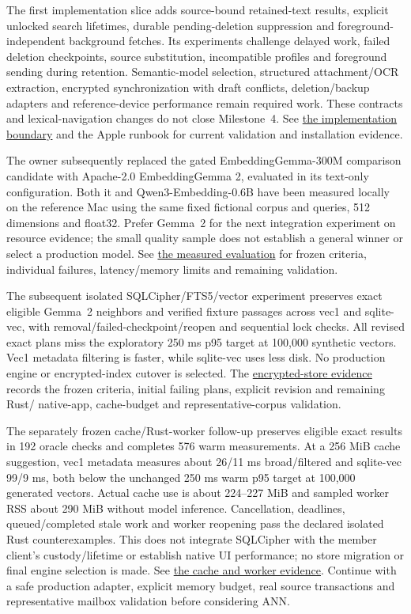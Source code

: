 \documentclass[11pt]{article}
\begin{document}
The first implementation slice adds source-bound retained-text results, explicit
unlocked search lifetimes, durable pending-deletion suppression and foreground-independent
background fetches. Its experiments challenge delayed work, failed deletion checkpoints,
source substitution, incompatible profiles and foreground sending during retention.
Semantic-model selection, structured attachment/OCR extraction, encrypted synchronization
with draft conflicts, deletion/backup adapters and reference-device performance remain
required work. These contracts and lexical-navigation changes do not close Milestone~4.
See \href{docs/private-semantic-navigation-implementation.md}{the implementation boundary}
and the Apple runbook for current validation and installation evidence.

The owner subsequently replaced the gated EmbeddingGemma-300M comparison candidate
with Apache-2.0 EmbeddingGemma 2, evaluated in its text-only configuration. Both it
and Qwen3-Embedding-0.6B have been measured locally on the reference Mac using the
same fixed fictional corpus and queries, 512 dimensions and float32. Prefer Gemma~2
for the next integration experiment on resource evidence; the small quality sample
does not establish a general winner or select a production model. See
\href{docs/embedding-model-evaluation.md}{the measured evaluation} for frozen criteria,
individual failures, latency/memory limits and remaining validation.

The subsequent isolated SQLCipher/FTS5/vector experiment preserves exact eligible
Gemma~2 neighbors and verified fixture passages across vec1 and sqlite-vec, with
removal/failed-checkpoint/reopen and sequential lock checks. All revised exact plans
miss the exploratory 250 ms p95 target at 100,000 synthetic vectors. Vec1 metadata
filtering is faster, while sqlite-vec uses less disk. No production engine or
encrypted-index cutover is selected. The
\href{docs/encrypted-vector-store-evaluation.md}{encrypted-store evidence} records
the frozen criteria, initial failing plans, explicit revision and remaining Rust/
native-app, cache-budget and representative-corpus validation.

The separately frozen cache/Rust-worker follow-up preserves eligible exact results
in 192 oracle checks and completes 576 warm measurements. At a 256 MiB cache
suggestion, vec1 metadata measures about 26/11 ms broad/filtered and sqlite-vec
99/9 ms, both below the unchanged 250 ms warm p95 target at 100,000 generated
vectors. Actual cache use is about 224--227 MiB and sampled worker RSS about
290 MiB without model inference. Cancellation, deadlines, queued/completed stale
work and worker reopening pass the declared isolated Rust counterexamples.
This does not integrate SQLCipher with the member client's custody/lifetime or
establish native UI performance; no store migration or final engine selection is
made. See \href{docs/vector-cache-worker-evaluation.md}{the cache and worker evidence}.
Continue with a safe production adapter, explicit memory budget, real source
transactions and representative mailbox validation before considering ANN.
\end{document}
